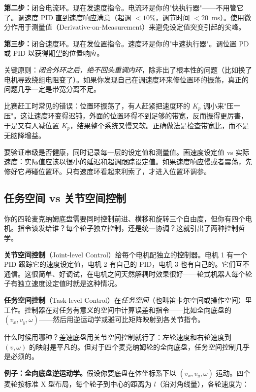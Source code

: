 \textbf{第二步：}闭合电流环。现在发速度指令。电流环是你的"快执行器"——不用管它了。调速度 PID 直到速度响应满意（超调 $<10\%$，调节时间 $<20$~ms）。使用微分作用于测量值（Derivative-on-Measurement）来避免设定值突变引起的尖峰。

\textbf{第三步：}闭合速度环。现在发位置指令。速度环是你的"中速执行器"。调位置 PD 或 PID 以获得期望的位置响应。

关键原则：\textit{闭合外环之后，绝不回头重调内环}，除非出了根本性的问题（比如换了电机导致绕组电阻变了）。如果你发现自己在调速度环来修位置环的振荡，真正的问题几乎一定是带宽分离不足。

比赛赶工时常见的错误：位置环振荡了，有人赶紧把速度环的 $K_p$ 调小来"压一压"。这让速度环变得迟钝，外面的位置环得不到足够的带宽，反而振得更厉害，于是又有人减位置 $K_p$，结果整个系统又慢又软。正确做法是检查带宽比，而不是无脑降增益。

要验证串级是否健康，同时记录每一层的设定值和测量值。画速度设定值 vs 实际速度：实际值应该以很小的延迟和超调跟踪设定值。如果速度响应慢或者震荡，先修好它\textit{再}碰位置环。只有速度环看起来利索了，才进入位置环调参。

\subsection{任务空间 vs 关节空间控制}

你的四轮麦克纳姆底盘需要同时控制前进、横移和旋转三个自由度，但你有四个电机。指令该发给谁？每个轮子独立控制，还是统一协调？这就引出了两种控制哲学。

\textbf{关节空间控制}（Joint-level Control）给每个电机配独立的控制器。电机 1 有一个 PID 跟踪它的速度设定值，电机 2 有自己的 PID，电机 3 也有自己的。它们互不通信。这很简单、好调试，在电机之间天然解耦时效果很好——轮式机器人每个轮子有独立速度设定值时就是这种情况。

\textbf{任务空间控制}（Task-level Control）在\textit{任务空间}（也叫笛卡尔空间或操作空间）里工作。控制器在对任务有意义的空间中计算误差和指令——比如全向底盘的 $(v_x, v_y, \omega)$——然后用逆运动学或雅可比矩阵映射到各关节指令。

什么时候用哪种？差速底盘用关节空间控制就行了：左轮速度和右轮速度到 $(v, \omega)$ 的映射是平凡的。但对于四个麦克纳姆轮的全向底盘，任务空间控制几乎是必须的。

\textbf{例子：全向底盘逆运动学。}假设你要底盘在体坐标系下以 $(v_x, v_y, \omega)$ 运动。四个麦轮按标准 X 型布局，每个轮子到中心的距离为 $l$（沿对角线量），各轮速度为：

